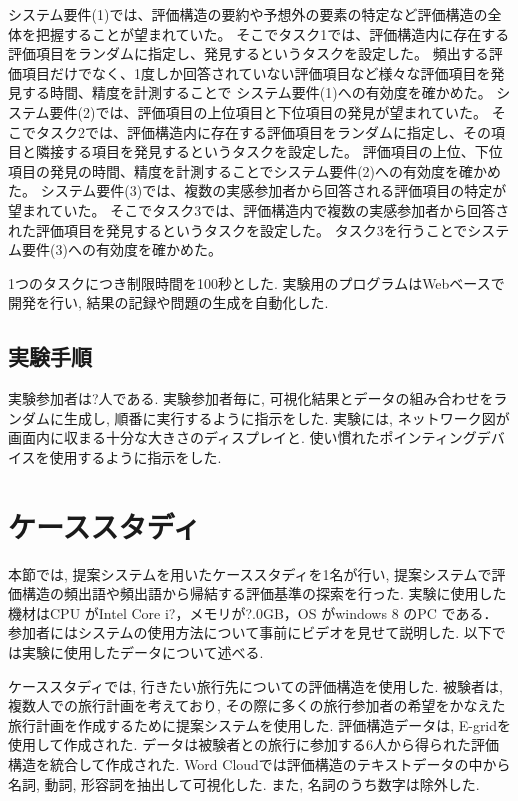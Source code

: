 \documentclass[syuuron]{kuee}
\begin{document}
			システム要件(1)では、評価構造の要約や予想外の要素の特定など評価構造の全体を把握することが望まれていた。
			そこでタスク1では、評価構造内に存在する評価項目をランダムに指定し、発見するというタスクを設定した。
			頻出する評価項目だけでなく、1度しか回答されていない評価項目など様々な評価項目を発見する時間、精度を計測することで
			システム要件(1)への有効度を確かめた。
			システム要件(2)では、評価項目の上位項目と下位項目の発見が望まれていた。
			そこでタスク2では、評価構造内に存在する評価項目をランダムに指定し、その項目と隣接する項目を発見するというタスクを設定した。
			評価項目の上位、下位項目の発見の時間、精度を計測することでシステム要件(2)への有効度を確かめた。
			システム要件(3)では、複数の実感参加者から回答される評価項目の特定が望まれていた。
			そこでタスク3では、評価構造内で複数の実感参加者から回答された評価項目を発見するというタスクを設定した。
			タスク3を行うことでシステム要件(3)への有効度を確かめた。
			
			1つのタスクにつき制限時間を100秒とした. 
			実験用のプログラムはWebベースで開発を行い, 結果の記録や問題の生成を自動化した. 
		
		\subsection{実験手順}
			実験参加者は?人である. 
			実験参加者毎に, 可視化結果とデータの組み合わせをランダムに生成し, 順番に実行するように指示をした. 
			実験には, ネットワーク図が画面内に収まる十分な大きさのディスプレイと. 使い慣れたポインティングデバイスを使用するように指示をした. 
		
	\section{ケーススタディ}
		本節では, 提案システムを用いたケーススタディを1名が行い, 提案システムで評価構造の頻出語や頻出語から帰結する評価基準の探索を行った. 
		実験に使用した機材はCPU がIntel Core i?，メモリが?.0GB，OS がwindows 8 のPC である．
		参加者にはシステムの使用方法について事前にビデオを見せて説明した. 以下では実験に使用したデータについて述べる. 
		
		ケーススタディでは, 行きたい旅行先についての評価構造を使用した. 
		被験者は, 複数人での旅行計画を考えており, その際に多くの旅行参加者の希望をかなえた旅行計画を作成するために提案システムを使用した. 
		評価構造データは, E-gridを使用して作成された. 
		データは被験者との旅行に参加する6人から得られた評価構造を統合して作成された. 
		Word Cloudでは評価構造のテキストデータの中から名詞, 動詞, 形容詞を抽出して可視化した. 
		また, 名詞のうち数字は除外した. 
		
\end{document}
